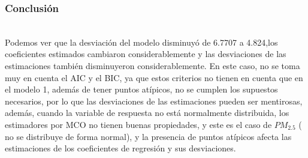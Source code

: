 \documentclass[12pt]{beamer}
\begin{document}
\begin{frame}
\frametitle{Conclusión}
~\\Podemos ver que la desviación del modelo disminuyó de 6.7707 a 4.824,los coeficientes estimados cambiaron considerablemente y las desviaciones de las estimaciones también disminuyeron considerablemente. En este caso, no se toma muy en cuenta el AIC y el BIC, ya que estos criterios no tienen en cuenta que en el modelo 1, además de tener puntos atípicos, no se cumplen los supuestos necesarios, por lo que las desviaciones de las estimaciones pueden ser mentirosas, además, cuando la variable de respuesta no está normalmente distribuida, los estimadores por MCO no tienen buenas propiedades, y este es el caso de $PM_{2.5}$ ( no se distribuye de forma normal), y la presencia de puntos atípicos afecta las estimaciones de los coeficientes de regresión y sus desviaciones.
\end{frame}
\end{document}
